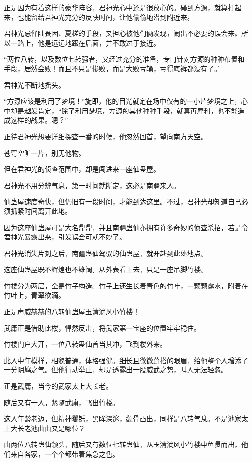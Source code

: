\begin{this_body}
正是因为有着这样的豪华阵容，君神光心中还是很放心的。碰到方源，就算打起来，也能留给君神光充分的反映时间，让他偷偷地潜到附近来。

君神光忌惮陆畏因、夏槎的手段，又担心被他们俩发现，闹出不必要的误会来。所以一路上，他是远远地跟在后面，并不敢过于接近。

“两位八转，以及数位七转强者，又经过充分的准备，专门针对方源的种种布置和手段，居然会败！而且不只是惨败，而是大败亏输，亏得底裤都没有了。”

君神光不断地摇头。

“方源应该是利用了梦境！”旋即，他的目光就定在场中仅有的一小片梦境之上，心中却是越发肯定，“除了利用梦境，方源的其他种种手段，就算再犀利，也不能造成这样的战果。嗯？”

正待君神光想要详细探查一番的时候，他忽然回首，望向南方天空。

苍穹空旷一片，别无他物。

但在君神光的侦查范围中，却是闯进来一座仙蛊屋。

君神光不用分辨气息，第一时间就断定，这必是南疆来人。

仙蛊屋速度奇快，但仍旧有一段时间，才能到达这里。不过，君神光却知道自己必须抓紧时间离开此地。

因为这座仙蛊屋可是大名鼎鼎，并且南疆蛊仙亦拥有许多奇妙的侦查杀招，若是令君神光暴露出来，引发误会可就不妙了。

君神光消失片刻之后，南疆蛊仙驾驭的仙蛊屋，就开赴到此处地点。

这座仙蛊屋既不辉煌也不雄阔，从外表看上去，只是一座吊脚竹楼。

竹楼分为两层，全是竹子构造。竹子上还生长着青色的竹叶，一颗颗露水，附着在竹叶上，青翠欲滴。

正是声威赫赫的八转仙蛊屋玉清滴风小竹楼！

武庸正是借助此楼，悍然反击，将武家第一宝座的位置牢牢稳住。

竹楼门户大开，一位八转蛊仙首当其冲，飞到楼外来。

此人中年模样，相貌普通，体格强健。细长且微微耸搭的眼眉，给他整个人增添了一分阴鸠之气。但他行动举止，却是透露出一股威武之势，叫人无法轻忽。

正是武庸，当今的武家太上大长老。

随后又有一人，紧随武庸，飞出竹楼。

这人年龄老迈，但精神矍铄，黑眸深邃，颧骨凸出，同样是八转气息。不是池家太上大长老池曲由又是哪位？

由两位八转蛊仙领头，随后又有数位七转蛊仙，从玉清滴风小竹楼中鱼贯而出。他们来自各家，一个个都带着焦急之色。


\end{this_body}
